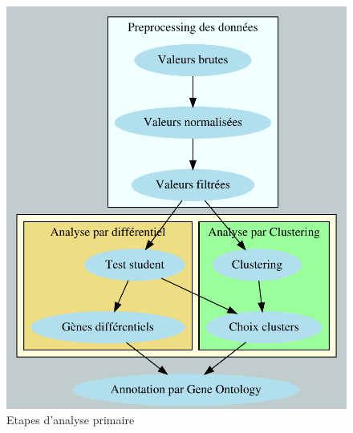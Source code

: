 \begin{figure}[H]
	\centering
		\includegraphics[scale=0.5]{workflow.pdf} 
		\caption{\label{pipeline} Etapes d'analyse primaire}
\end{figure}
